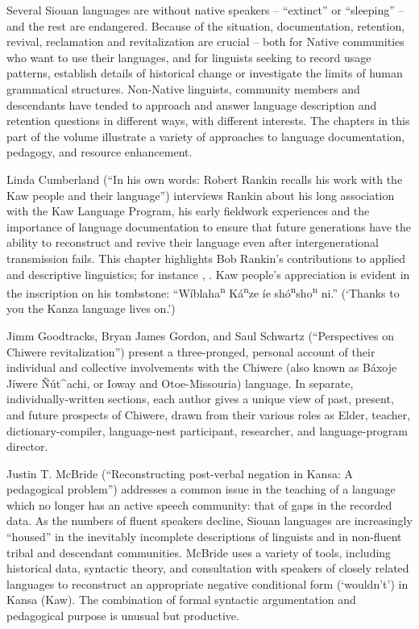 \begin{refsection}

Several Siouan languages are without native speakers -- ``extinct'' or ``sleeping'' -- and the rest are endangered. Because of the situation, documentation, retention, revival, reclamation and revitalization are crucial -- both for Native communities who want to use their languages, and for linguists seeking to record usage patterns, establish details of historical change or investigate the limits of human grammatical structures. Non-Native linguists, community members and descendants have tended to approach and answer language description and retention questions in different ways, with different interests. The chapters in this part of the volume illustrate a variety of approaches to language documentation, pedagogy, and resource enhancement.

Linda Cumberland (``In his own words: Robert Rankin recalls his work with the Kaw people and their language'') interviews Rankin about his long association with the Kaw Language Program, his early fieldwork experiences and the importance of language documentation to ensure that future generations have the ability to reconstruct and revive their language even after intergenerational transmission fails. This chapter highlights Bob Rankin's contributions to applied and descriptive linguistics; for instance \citet{CumberlandRankin2012}, \citet{Rankin1989}. Kaw people's appreciation is evident in the inscription on his tombstone: ``W\'iblaha\textsuperscript{n} K\'a\textsuperscript{n}ze \'ie sh\'o\textsuperscript{n}sho\textsuperscript{n} ni.'' (`Thanks to you the Kanza language lives on.')

Jimm Goodtracks, Bryan James Gordon, and Saul Schwartz (``Perspectives on Chiwere revitalization'') present a three-pronged, personal account of their individual and collective involvements with the Chiwere (also known as Báxoje Jíwere \~{N}út\^{}achi, or Ioway and Otoe-Missouria) language. In separate, individually-written sections, each author gives a unique view of past, present, and future prospects of Chiwere, drawn from their various roles as Elder, teacher, dictionary-compiler, language-nest participant, researcher, and language-program director. 

Justin T. McBride (``Reconstructing post-verbal negation in Kansa: A pedagogical problem'') addresses a common issue in the teaching of a language which no longer has an active speech community: that of gaps in the recorded data. As the numbers of fluent speakers decline, Siouan languages are increasingly ``housed'' in the inevitably incomplete descriptions of linguists and in non-fluent tribal and descendant communities. McBride uses a variety of tools, including historical data, syntactic theory, and consultation with speakers of closely related languages to reconstruct an appropriate negative conditional form (`wouldn't') in Kansa (Kaw). The combination of formal syntactic argumentation and pedagogical purpose is unusual but productive. 


\end{refsection}
